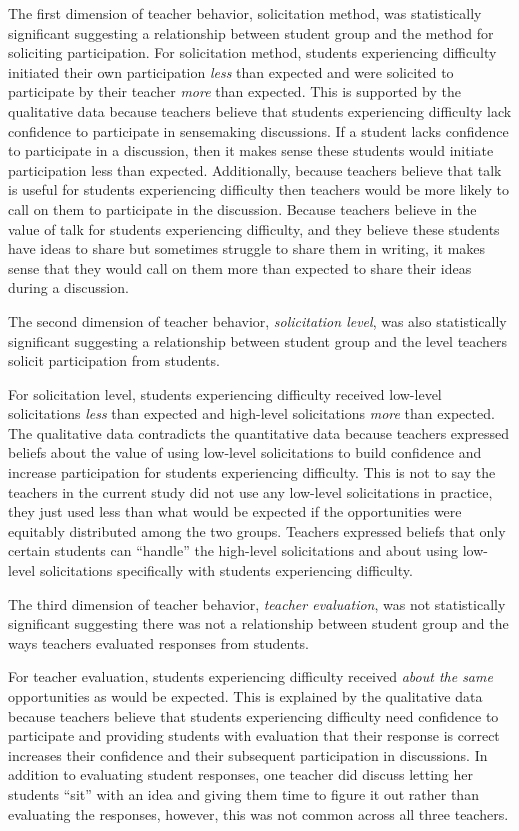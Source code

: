 \documentclass{sig-alternate} %
\begin{document}
\begin{large}
The first dimension of teacher behavior, solicitation method, was statistically significant suggesting a relationship between student group and the method for soliciting participation. 
\newpage
For solicitation method, students experiencing difficulty initiated their own participation \textit{less} than expected and were solicited to participate by their teacher \textit{more} than expected. This is supported by the qualitative data because teachers believe that students experiencing difficulty lack confidence to participate in sensemaking discussions. If a student lacks confidence to participate in a discussion, then it makes sense these students would initiate participation less than expected. Additionally, because teachers believe that talk is useful for students experiencing difficulty then teachers would be more likely to call on them to participate in the discussion. Because teachers believe in the value of talk for students experiencing difficulty, and they believe these students have ideas to share but sometimes struggle to share them in writing, it makes sense that they would call on them more than expected to share their ideas during a discussion. 

The second dimension of teacher behavior, \textit{solicitation level}, was also statistically significant suggesting a relationship between student group and the level teachers solicit participation from students. 

For solicitation level, students experiencing difficulty received low-level solicitations \textit{less} than expected and high-level solicitations \textit{more} than expected. The qualitative data contradicts the quantitative data because teachers expressed beliefs about the value of using low-level solicitations to build confidence and increase participation for students experiencing difficulty. This is not to say the teachers in the current study did not use any low-level solicitations in practice, they just used less than what would be expected if the opportunities were equitably distributed among the two groups. Teachers expressed beliefs that only certain students can “handle” the high-level solicitations and about using low-level solicitations specifically with students experiencing difficulty. 

The third dimension of teacher behavior, \textit{teacher evaluation}, was not statistically significant suggesting there was not a relationship between student group and the ways teachers evaluated responses from students. 

For teacher evaluation, students experiencing difficulty received \textit{about the same} opportunities as would be expected. This is explained by the qualitative data because teachers believe that students experiencing difficulty need confidence to participate and providing students with evaluation that their response is correct increases their confidence and their subsequent participation in discussions. In addition to evaluating student responses, one teacher did discuss letting her students “sit” with an idea and giving them time to figure it out rather than evaluating the responses, however, this was not common across all three teachers.


\end{large}
\end{document}
